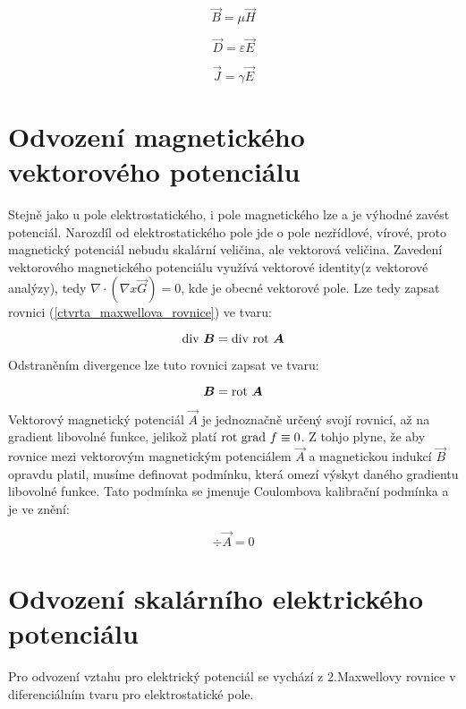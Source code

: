 \begin{equation}
	\vec{B} = \mu \vec{H} 
	\label{permeabilita}
\end{equation}

\begin{equation}
	\vec{D} = \varepsilon \vec{E}
	\label{epsilon}
\end{equation}

\begin{equation}
	\vec{J} =  \gamma \vec{E}
	\label{gama}
\end{equation}

\section{Odvození magnetického vektorového potenciálu}
Stejně jako u pole elektrostatického, i pole magnetického lze a je výhodné zavést potenciál. Narozdíl od elektrostatického pole jde o pole nezřídlové, vírové, proto magnetický potenciál nebudu skalární veličina, ale vektorová veličina. Zavedení vektorového magnetického potenciálu využívá vektorové identity(z vektorové analýzy), tedy $\nabla \cdot (\nabla x \vec{G})=0$, kde  je obecné vektorové pole. Lze tedy zapsat rovnici (\ref{ctvrta_maxwellova_rovnice}) ve tvaru:

\begin{equation}
	\mathrm{div}\  \mbox{\boldmath$B$} =  \mathrm{div}\  \mathrm{rot}\  \mbox{\boldmath$A$}
	\label{odvozeni_potencial}
\end{equation}

Odstraněním divergence lze tuto rovnici zapsat ve tvaru:

\begin{equation}
	\mbox{\boldmath$B$} =  \mathrm{rot}\  \mbox{\boldmath$A$}
	\label{magneticky_vektorovy_potencial}
\end{equation}

Vektorový magnetický potenciál $\vec{A}$ je jednoznačně určený svojí rovnicí, až na gradient libovolné funkce, jelikož platí $\mathrm{rot}\  \mathrm{grad}\  f \equiv 0$. Z tohjo plyne, že aby rovnice mezi vektorovým magnetickým potenciálem $\vec{A}$ a magnetickou indukcí $\vec{B}$ opravdu platil, musíme definovat podmínku, která omezí výskyt daného gradientu libovolné funkce. Tato podmínka se jmenuje Coulombova kalibrační podmínka a je ve znění:

\begin{equation}
	\div \vec{A} =  0
	\label{coulombova_kalibracni_podminka}
\end{equation}

\section{Odvození skalárního elektrického potenciálu}
Pro odvození vztahu pro elektrický potenciál se vychází z 2.Maxwellovy rovnice v diferenciálním tvaru pro elektrostatické pole.

